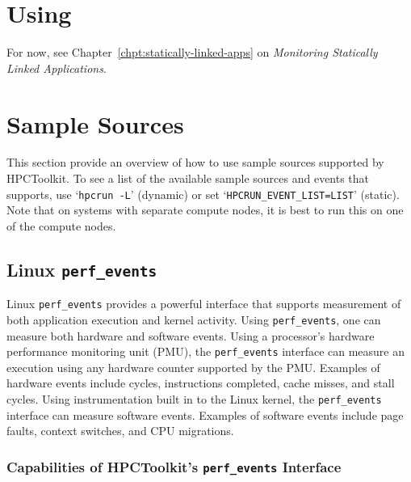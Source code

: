 
\section{Using \hpclink{}}

For now, see Chapter~\ref{chpt:statically-linked-apps} on {\it
Monitoring Statically Linked Applications}.


\section{Sample Sources}

This section provide an overview of how to use sample sources supported by HPCToolkit.  To
see a list of the available sample sources and events that \hpcrun{}
supports, use `\verb|hpcrun -L|' (dynamic) or set
`\verb|HPCRUN_EVENT_LIST=LIST|' (static).  Note that on systems with
separate compute nodes, it is best to run this on one of the
compute nodes.

\newcommand{\perfevents}{{\tt perf\_events}}

\subsection{Linux \perfevents}

Linux \perfevents{} provides a powerful interface that supports 
measurement of both application execution and kernel activity. 
Using
\perfevents{}, one can measure both hardware and software events. 
Using a processor's hardware performance monitoring unit (PMU), the
\perfevents{} interface can measure an execution using any hardware counter
supported by the PMU. Examples of hardware events include cycles, instructions
completed, cache misses, and stall cycles. Using instrumentation built in to the Linux kernel,
the \perfevents{} interface can measure software events. Examples of software events include page
faults, context switches, and CPU migrations. 



\subsubsection{Capabilities of HPCToolkit's \perfevents{} Interface}

